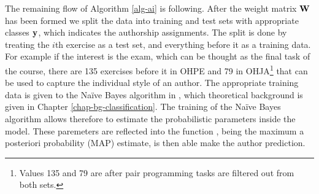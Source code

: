 \noindent
The remaining flow of Algorithm \ref{alg-ai} is following. After the weight matrix $\mathbf{W}$ has been formed we split the data into training and test sets with appropriate classes $\mathbf{y}$, which indicates the authorship assignments. The split is done by treating the $i$th exercise as a test set, and everything before it as a training data. For example if the interest is the exam, which can be thought as the final task of the course, there are 135 exercises before it in OHPE and 79 in OHJA\footnote{Values 135 and 79 are after pair programming tasks are filtered out from both sets.} that can be used to capture the individual style of an author. The appropriate training data is given to the Naïve Bayes algorithm in , which theoretical background is given in Chapter \ref{chap-bg-classification}. The training of the Naïve Bayes algorithm allows therefore to estimate the probabilistic parameters inside the model. These paremeters are reflected into the function , being the maximum a posteriori probability (MAP) estimate, is then able make the author prediction.




